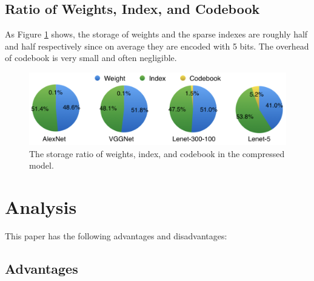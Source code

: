 \documentclass[12pt]{article}
\begin{document}
\subsection{Ratio of Weights, Index, and Codebook}

As Figure \ref{fig:storage_ratio} shows, the storage of  weights and the sparse indexes are roughly half and half respectively since on average they are encoded with 5 bits. The overhead of codebook is very small and often negligible.

\begin{figure}
    \centering
    \includegraphics[width=0.7\linewidth]{images/f11_storage_ratio.png}
    \caption{The storage ratio of weights, index, and codebook in the compressed model.}
    \label{fig:storage_ratio}
\end{figure}

\section{Analysis}

This paper has the following advantages and disadvantages:

\subsection{Advantages}
\end{document}
